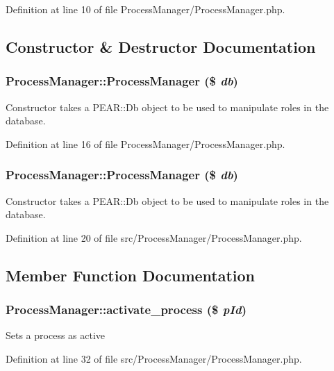 Definition at line 10 of file Process\-Manager/Process\-Manager.php.

\subsection{Constructor \& Destructor Documentation}
\subsubsection{\setlength{\rightskip}{0pt plus 5cm}Process\-Manager::Process\-Manager (\$ {\em db})}\label{classProcessManager_a0}


Constructor takes a PEAR::Db object to be used to manipulate roles in the database. 

Definition at line 16 of file Process\-Manager/Process\-Manager.php.
\subsubsection{\setlength{\rightskip}{0pt plus 5cm}Process\-Manager::Process\-Manager (\$ {\em db})}\label{classProcessManager_a10}


Constructor takes a PEAR::Db object to be used to manipulate roles in the database. 

Definition at line 20 of file src/Process\-Manager/Process\-Manager.php.

\subsection{Member Function Documentation}
\subsubsection{\setlength{\rightskip}{0pt plus 5cm}Process\-Manager::activate\_\-process (\$ {\em p\-Id})}\label{classProcessManager_a11}


Sets a process as active 

Definition at line 32 of file src/Process\-Manager/Process\-Manager.php.
